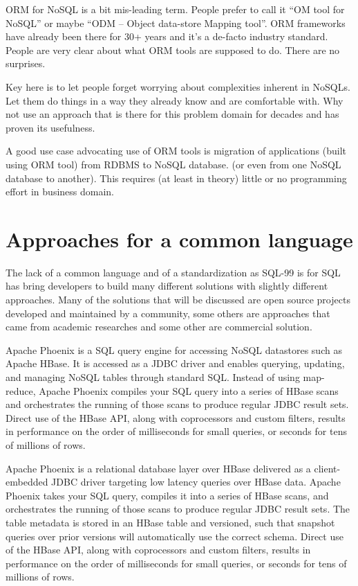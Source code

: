 ORM for NoSQL is a bit mis-leading term. People prefer to call it “OM tool for NoSQL” or maybe “ODM – Object data-store Mapping tool”. ORM frameworks have already been there for 30+ years and it’s a de-facto industry standard. People are very clear about what ORM tools are supposed to do. There are no surprises.

Key here is to let people forget worrying about complexities inherent in NoSQLs. Let them do things in a way they already know and are comfortable with. Why not use an approach that is there for this problem domain for decades and has proven its usefulness.

A good use case advocating use of ORM tools is migration of applications (built using ORM tool) from RDBMS to NoSQL database. (or even from one NoSQL database to another). This requires (at least in theory) little or no programming effort in business domain.



\section{Approaches for a common language}
\label{sec:common-language}
The lack of a common language and of a standardization as SQL-99 is for SQL has bring developers to build many different solutions with slightly different approaches.
Many of the solutions that will be discussed are open source projects developed and maintained by a community, some others are approaches that came from academic researches and some other are commercial solution.

Apache Phoenix is a SQL query engine for accessing NoSQL datastores such as Apache HBase. It is accessed as a JDBC driver and enables querying, updating, and managing NoSQL tables through standard SQL. Instead of using map-reduce, Apache Phoenix compiles your SQL query into a series of HBase scans and orchestrates the running of those scans to produce regular JDBC result sets. Direct use of the HBase API, along with coprocessors and custom filters, results in performance on the order of milliseconds for small queries, or seconds for tens of millions of rows.

Apache Phoenix is a relational database layer over HBase delivered as a client-embedded JDBC driver targeting low latency queries over HBase data. Apache Phoenix takes your SQL query, compiles it into a series of HBase scans, and orchestrates the running of those scans to produce regular JDBC result sets. The table metadata is stored in an HBase table and versioned, such that snapshot queries over prior versions will automatically use the correct schema. Direct use of the HBase API, along with coprocessors and custom filters, results in performance on the order of milliseconds for small queries, or seconds for tens of millions of rows.

